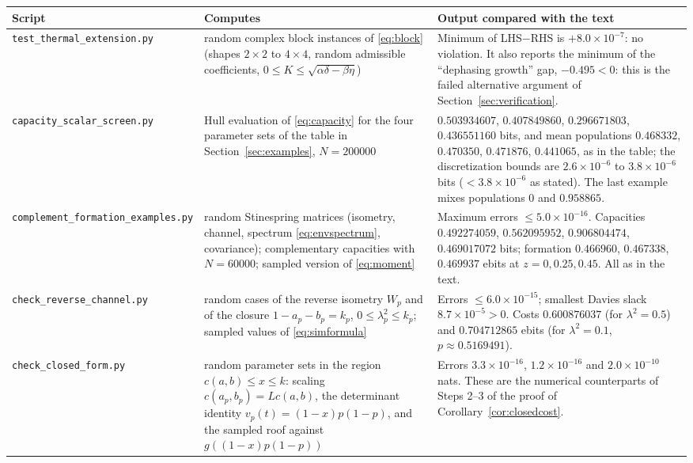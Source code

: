 \documentclass[11pt]{article}
\begin{document}
\begingroup\footnotesize\setlength{\tabcolsep}{4pt}
\begin{tabular}{@{}>{\raggedright\arraybackslash}p{3.1cm}>{\raggedright\arraybackslash}p{5.0cm}>{\raggedright\arraybackslash}p{7.3cm}@{}}
\toprule
Script&Computes&Output compared with the text\\
\midrule
\texttt{test\_thermal\_\allowbreak extension.py}&16000 random complex block instances of \eqref{eq:block} (shapes $2\times2$ to $4\times4$, random admissible coefficients, $0\le K\le\sqrt{\alpha\delta-\beta\eta}$)&Minimum of LHS$-$RHS is $+8.0\times10^{-7}$: no violation. It also reports the minimum of the ``dephasing growth'' gap, $-0.495<0$: this is the failed alternative argument of Section~\ref{sec:verification}.\\
\texttt{capacity\_scalar\_\allowbreak screen.py}&Hull evaluation of \eqref{eq:capacity} for the four parameter sets of the table in Section~\ref{sec:examples}, $N=200000$&$0.503934607$, $0.407849860$, $0.296671803$, $0.436551160$ bits, and mean populations $0.468332$, $0.470350$, $0.471876$, $0.441065$, as in the table; the discretization bounds are $2.6\times10^{-6}$ to $3.8\times10^{-6}$ bits ($<3.8\times10^{-6}$ as stated). The last example mixes populations $0$ and $0.958865$.\\
\texttt{complement\_\allowbreak formation\_\allowbreak examples.py}&500 random Stinespring matrices (isometry, channel, spectrum \eqref{eq:envspectrum}, covariance); complementary capacities with $N=60000$; sampled version of \eqref{eq:moment}&Maximum errors $\le5.0\times10^{-16}$. Capacities $0.492274059$, $0.562095952$, $0.906804474$, $0.469017072$ bits; formation $0.466960$, $0.467338$, $0.469937$ ebits at $z=0,0.25,0.45$. All as in the text.\\
\texttt{check\_reverse\_\allowbreak channel.py}&500 random cases of the reverse isometry $W_p$ and of the closure $1-a_p-b_p=k_p$, $0\le\lambda_p^2\le k_p$; sampled values of \eqref{eq:simformula}&Errors $\le6.0\times10^{-15}$; smallest Davies slack $8.7\times10^{-5}>0$. Costs $0.600876037$ (for $\lambda^2=0.5$) and $0.704712865$ ebits (for $\lambda^2=0.1$, $p\approx0.5169491$).\\
\texttt{check\_closed\_\allowbreak form.py}&60 random parameter sets in the region $c(a,b)\le x\le k$: scaling $c(a_p,b_p)=Lc(a,b)$, the determinant identity $v_p(t)=(1-x)p(1-p)$, and the sampled roof against $g((1-x)p(1-p))$&Errors $3.3\times10^{-16}$, $1.2\times10^{-16}$ and $2.0\times10^{-10}$ nats. These are the numerical counterparts of Steps 2--3 of the proof of Corollary~\ref{cor:closedcost}.\\

\end{tabular}
\end{document}

